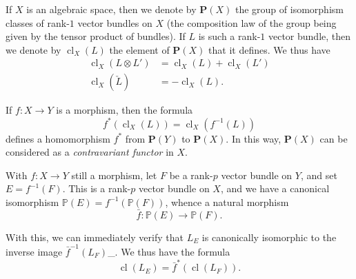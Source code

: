\documentclass{article}
\newcommand{\oldpage}[1]{\marginpar{\footnotesize$\Big\vert$ \textit{p.~#1}}}
\begin{document}
\oldpage{139}

If \(X\) is an algebraic space, then we denote by \(\mathbf{P}(X)\) the group of isomorphism classes of rank-\(1\) vector bundles on \(X\) (the composition law of the group being given by the tensor product of bundles).
If \(L\) is such a rank-\(1\) vector bundle, then we denote by \(\operatorname{cl}_X(L)\) the element of \(\mathbf{P}(X)\) that it defines.
We thus have
\[
  \begin{aligned}
    \operatorname{cl}_X(L\otimes L') &= \operatorname{cl}_X(L) + \operatorname{cl}_X(L')
  \\\operatorname{cl}_X(\check{L}) &= -\operatorname{cl}_X(L).
  \end{aligned}
\]

If \(f\colon X\to Y\) is a morphism, then the formula
\[
  f^*(\operatorname{cl}_X(L)) = \operatorname{cl}_X(f^{-1}(L))
\]
defines a homomorphism \(f^*\) from \(\mathbf{P}(Y)\) to \(\mathbf{P}(X)\).
In this way, \(\mathbf{P}(X)\) can be considered as a \emph{contravariant functor} in \(X\).

With \(f\colon X\to Y\) still a morphism, let \(F\) be a rank-\(p\) vector bundle on \(Y\), and set \(E=f^{-1}(F)\).
This is a rank-\(p\) vector bundle on \(X\), and we have a canonical isomorphism \(\mathbb{P}(E)=f^{-1}(\mathbb{P}(F))\), whence a natural morphism
\[
  \bar{f}\colon \mathbb{P}(E) \to \mathbb{P}(F).
\]

With this, we can immediately verify that \(L_E\) is canonically isomorphic to the inverse image \(\bar{f}^{-1}(L_F)\)\_.
We thus have the formula
\[
  \operatorname{cl}(L_E) = \bar{f}^*(\operatorname{cl}(L_F)).
\]
\end{document}
